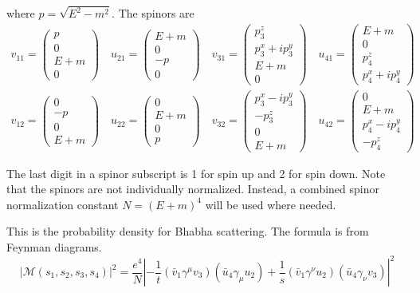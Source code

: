 \documentclass[12pt]{article}
\begin{document}
\noindent
where $p=\sqrt{E^2-m^2}$.
The spinors are
\begin{gather*}
v_{11}=\begin{pmatrix}p\\0\\E+m\\0\end{pmatrix}\quad
u_{21}=\begin{pmatrix}E+m\\0\\-p\\0\end{pmatrix}\quad
v_{31}=\begin{pmatrix}p_3^z\\p_3^x+ip_3^y\\E+m\\0\end{pmatrix}\quad
u_{41}=\begin{pmatrix}E+m\\0\\p_4^z\\p_4^x+ip_4^y\end{pmatrix}
\\
v_{12}=\begin{pmatrix}0\\-p\\0\\E+m\end{pmatrix}\quad
u_{22}=\begin{pmatrix}0\\E+m\\0\\p\end{pmatrix}\quad
v_{32}=\begin{pmatrix}p_3^x-ip_3^y\\-p_3^z\\0\\E+m\end{pmatrix}\quad
u_{42}=\begin{pmatrix}0\\E+m\\p_4^x-ip_4^y\\-p_4^z\end{pmatrix}
\end{gather*}

\noindent
The last digit in a spinor subscript is 1 for spin up and 2 for spin down.
Note that the spinors are not individually normalized.
Instead, a combined spinor normalization constant $N=(E+m)^4$
will be used where needed.

\newpage
\noindent
This is the probability density for Bhabha scattering.
The formula is from Feynman diagrams.
$$
|\mathcal{M}(s_1,s_2,s_3,s_4)|^2=\frac{e^4}{N}
\left|
-\frac{1}{t}(\bar{v}_1\gamma^\mu v_3)(\bar{u}_4\gamma_\mu u_2)
+\frac{1}{s}(\bar{v}_1\gamma^\nu u_2)(\bar{u}_4\gamma_\nu v_3)
\right|^2
$$
\end{document}
